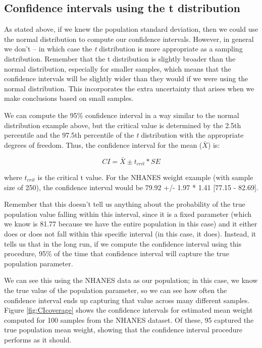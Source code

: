 \documentclass[12pt,]{book}
\theoremstyle{definition}
\theoremstyle{definition}
\theoremstyle{definition}
\theoremstyle{remark}
\begin{document}
\hypertarget{confidence-intervals-using-the-t-distribution}{%
\subsection{Confidence intervals using the t distribution}\label{confidence-intervals-using-the-t-distribution}}

As stated above, if we knew the population standard deviation, then we could use the normal distribution to compute our confidence intervals. However, in general we don't -- in which case the \emph{t} distribution is more appropriate as a sampling distribution. Remember that the t distribution is slightly broader than the normal distribution, especially for smaller samples, which means that the confidence intervals will be slightly wider than they would if we were using the normal distribution. This incorporates the extra uncertainty that arises when we make conclusions based on small samples.

We can compute the 95\% confidence interval in a way similar to the normal distribution example above, but the critical value is determined by the 2.5th percentile and the 97.5th percentile of the \emph{t} distribution with the appropriate degrees of freedom. Thus, the confidence interval for the mean (\(\bar{X}\)) is:

\[
CI = \bar{X} \pm t_{crit}*SE
\]

where \(t_{crit}\) is the critical t value.
For the NHANES weight example (with sample size of 250), the confidence interval would be 79.92 +/- 1.97 * 1.41 {[}77.15 - 82.69{]}.

Remember that this doesn't tell us anything about the probability of the true population value falling within this interval, since it is a fixed parameter (which we know is 81.77 because we have the entire population in this case) and it either does or does not fall within this specific interval (in this case, it does). Instead, it tells us that in the long run, if we compute the confidence interval using this procedure, 95\% of the time that confidence interval will capture the true population parameter.

We can see this using the NHANES data as our population; in this case, we know the true value of the population parameter, so we can see how often the confidence interval ends up capturing that value across many different samples. Figure \ref{fig:CIcoverage} shows the confidence intervals for estimated mean weight computed for 100 samples from the NHANES dataset. Of these, 95 captured the true population mean weight, showing that the confidence interval procedure performs as it should.
\end{document}
